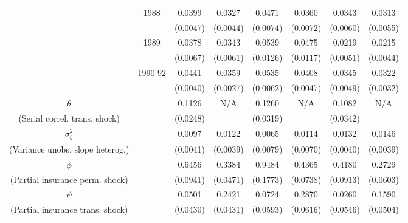 \begin{table}
\begin{center}
{\begin{tabular}{cccc|cc|cc}
\\  & 1988 & 0.0399 &   0.0327 & 0.0471 &   0.0360 & 0.0343 &   0.0313
\\  &                    & (0.0047) & (0.0044)  & (0.0074) & (0.0072)  & (0.0060) & (0.0055) 
\\  & 1989 & 0.0378 &   0.0343 & 0.0539 &   0.0475 & 0.0219 &   0.0215
\\  &                    & (0.0067) & (0.0061)  & (0.0126) & (0.0117)  & (0.0051) & (0.0044) 
\\  & 1990-92 & 0.0441 &   0.0359 & 0.0535 &   0.0408 & 0.0345 &   0.0322 
\\  &         & (0.0040) & (0.0027) & (0.0062) & (0.0047) & (0.0049) & (0.0032) 
\\ \hline  
 $\theta$ &     & 0.1126 &   N/A & 0.1260 &   N/A & 0.1082 &   N/A 
\\ (Serial correl. trans. shock) &     & (0.0248) &  & (0.0319) &  & (0.0342) &  
\\ $\sigma^2_{\xi}$ &     & 0.0097 &   0.0122 & 0.0065 &   0.0114 & 0.0132 &   0.0146 
\\ (Variance unobs. slope heterog.) &     & (0.0041) & (0.0039) & (0.0079) & (0.0070) & (0.0040) & (0.0039) 
\\ \hline  
 $\phi$ &     & 0.6456 &   0.3384 & 0.9484 &   0.4365 & 0.4180 &   0.2729 
\\ (Partial insurance perm. shock) &     & (0.0941) & (0.0471) & (0.1773) & (0.0738) & (0.0913) & (0.0603) 
\\ $\psi$ &     & 0.0501 &   0.2421 & 0.0724 &   0.2870 & 0.0260 &   0.1590 
\\ (Partial insurance trans. shock) &     & (0.0430) & (0.0431) & (0.0593) & (0.0616) & (0.0546) & (0.0504) 
\\ \hline  
 \end{tabular}   
 } 
 \usebox{\ReplicationTable}  
\settowidth\TableWidth{\usebox{\ReplicationTable}} %
\end{center}  
\end{table}  
